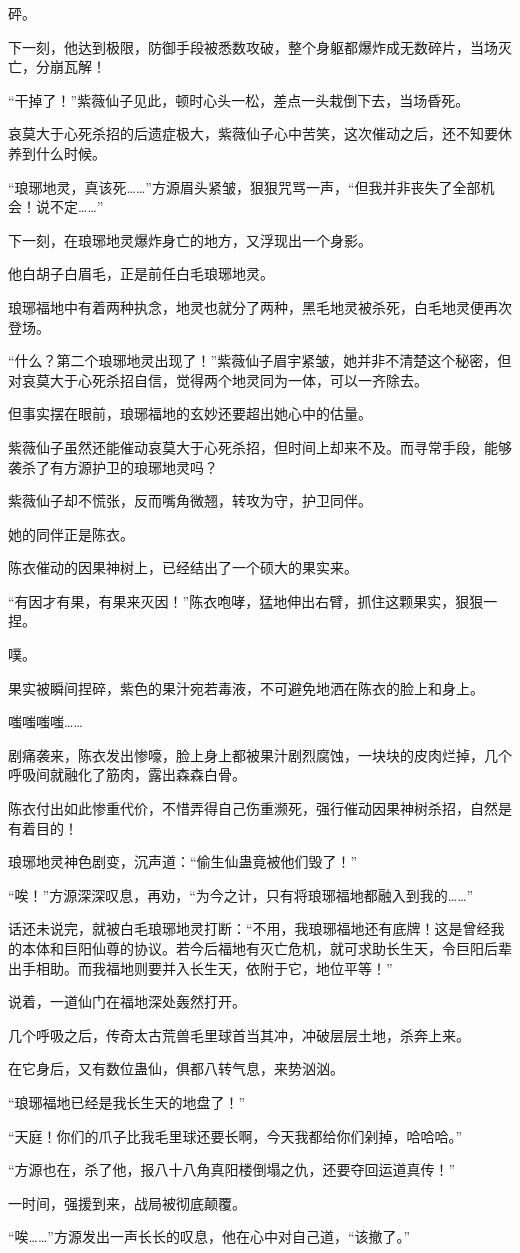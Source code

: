 \begin{this_body}
砰。

下一刻，他达到极限，防御手段被悉数攻破，整个身躯都爆炸成无数碎片，当场灭亡，分崩瓦解！

“干掉了！”紫薇仙子见此，顿时心头一松，差点一头栽倒下去，当场昏死。

哀莫大于心死杀招的后遗症极大，紫薇仙子心中苦笑，这次催动之后，还不知要休养到什么时候。

“琅琊地灵，真该死……”方源眉头紧皱，狠狠咒骂一声，“但我并非丧失了全部机会！说不定……”

下一刻，在琅琊地灵爆炸身亡的地方，又浮现出一个身影。

他白胡子白眉毛，正是前任白毛琅琊地灵。

琅琊福地中有着两种执念，地灵也就分了两种，黑毛地灵被杀死，白毛地灵便再次登场。

“什么？第二个琅琊地灵出现了！”紫薇仙子眉宇紧皱，她并非不清楚这个秘密，但对哀莫大于心死杀招自信，觉得两个地灵同为一体，可以一齐除去。

但事实摆在眼前，琅琊福地的玄妙还要超出她心中的估量。

紫薇仙子虽然还能催动哀莫大于心死杀招，但时间上却来不及。而寻常手段，能够袭杀了有方源护卫的琅琊地灵吗？

紫薇仙子却不慌张，反而嘴角微翘，转攻为守，护卫同伴。

她的同伴正是陈衣。

陈衣催动的因果神树上，已经结出了一个硕大的果实来。

“有因才有果，有果来灭因！”陈衣咆哮，猛地伸出右臂，抓住这颗果实，狠狠一捏。

噗。

果实被瞬间捏碎，紫色的果汁宛若毒液，不可避免地洒在陈衣的脸上和身上。

嗤嗤嗤嗤……

剧痛袭来，陈衣发出惨嚎，脸上身上都被果汁剧烈腐蚀，一块块的皮肉烂掉，几个呼吸间就融化了筋肉，露出森森白骨。

陈衣付出如此惨重代价，不惜弄得自己伤重濒死，强行催动因果神树杀招，自然是有着目的！

琅琊地灵神色剧变，沉声道：“偷生仙蛊竟被他们毁了！”

“唉！”方源深深叹息，再劝，“为今之计，只有将琅琊福地都融入到我的……”

话还未说完，就被白毛琅琊地灵打断：“不用，我琅琊福地还有底牌！这是曾经我的本体和巨阳仙尊的协议。若今后福地有灭亡危机，就可求助长生天，令巨阳后辈出手相助。而我福地则要并入长生天，依附于它，地位平等！”

说着，一道仙门在福地深处轰然打开。

几个呼吸之后，传奇太古荒兽毛里球首当其冲，冲破层层土地，杀奔上来。

在它身后，又有数位蛊仙，俱都八转气息，来势汹汹。

“琅琊福地已经是我长生天的地盘了！”

“天庭！你们的爪子比我毛里球还要长啊，今天我都给你们剁掉，哈哈哈。”

“方源也在，杀了他，报八十八角真阳楼倒塌之仇，还要夺回运道真传！”

一时间，强援到来，战局被彻底颠覆。

“唉……”方源发出一声长长的叹息，他在心中对自己道，“该撤了。”

\end{this_body}

